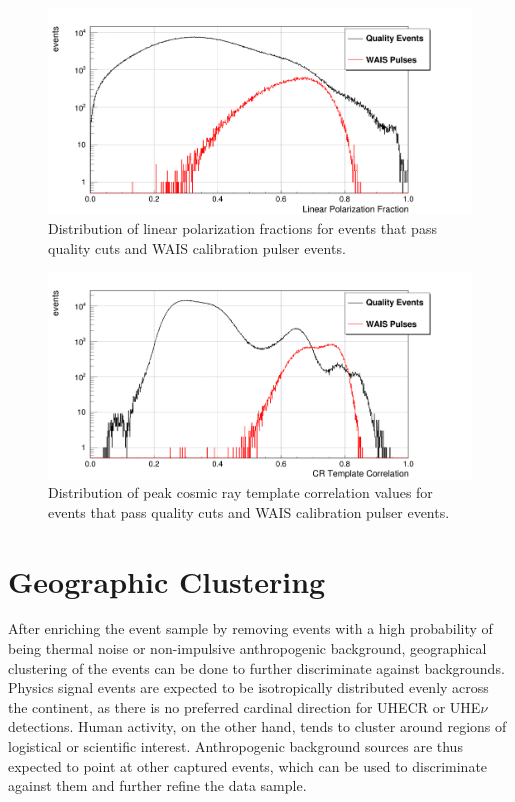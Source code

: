 \begin{figure}
	\centering
	\includegraphics[width=\textwidth]{figures/linPolCut}
	\caption{Distribution of linear polarization fractions for events that pass quality cuts and WAIS calibration pulser events.} 
	\label{fig:linPolCut}
\end{figure}

\begin{figure}
	\centering
	\includegraphics[width=\textwidth]{figures/tempCorrCut}
	\caption{Distribution of peak cosmic ray template correlation values for events that pass quality cuts and WAIS calibration pulser events.} 
	\label{fig:tempCorrCut}
\end{figure}
	
	

	



\section{Geographic Clustering}%
	After enriching the event sample by removing events with a high probability of being thermal noise or non-impulsive anthropogenic background, geographical clustering of the events can be done to further discriminate against backgrounds. Physics signal events are expected to be isotropically distributed evenly across the continent, as there is no preferred cardinal direction for UHECR or UHE$\nu$ detections.  Human activity, on the other hand, tends to cluster around regions of logistical or scientific interest.  Anthropogenic background sources are thus expected to point at other captured events, which can be used to discriminate against them and further refine the data sample. 

